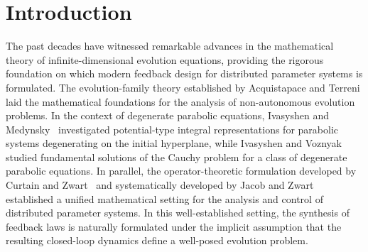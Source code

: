 \documentclass[pdflatex,sn-mathphys-num]{sn-jnl}
\theoremstyle{thmstyleone}%
\theoremstyle{thmstyletwo}%
\theoremstyle{thmstylethree}%
\begin{document}


\maketitle

\section{Introduction}

The past decades have witnessed remarkable advances in the mathematical theory of infinite-dimensional evolution equations, providing the rigorous foundation on which modern feedback design for distributed parameter systems is formulated. The evolution-family theory established by Acquistapace and Terreni
\cite{AcquistapaceTerreni1984Existence,
AcquistapaceTerreni1985ConstantDomains,
AcquistapaceTerreni1987Unified}
laid the mathematical foundations for the analysis of non-autonomous evolution problems. In the context of degenerate parabolic equations, Ivasyshen and Medynsky~\cite{ivasyshen2000properties} investigated potential-type integral representations for parabolic systems degenerating on the initial hyperplane, while Ivasyshen and Voznyak~\cite{ivasyshen2000fundamental} studied fundamental solutions of the Cauchy problem for a class of degenerate parabolic equations. In parallel, the operator-theoretic formulation developed by Curtain and Zwart~\cite{CurtainZwart1995InfiniteDimensional} and systematically developed by Jacob and Zwart~\cite{JacobZwart2018OperatorTheoretic} established a unified mathematical setting for the analysis and control of distributed parameter systems. In this well-established setting, the synthesis of feedback laws is naturally formulated under the implicit assumption that the resulting closed-loop dynamics define a well-posed evolution problem.
\end{document}
